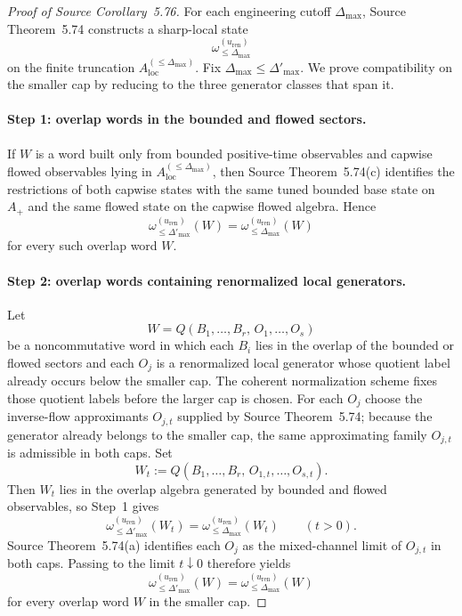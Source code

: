 \begin{proof}[Proof of Source Corollary~5.76]
For each engineering cutoff $\Delta_{\max}$, Source Theorem~5.74 constructs a sharp-local state
\[
\omega^{(u_{\mathrm{ren}})}_{\le \Delta_{\max}}
\]
on the finite truncation $A_{\mathrm{loc}}^{(\le \Delta_{\max})}$. Fix $\Delta_{\max}\le \Delta'_{\max}$. We prove compatibility on the smaller cap by reducing to the three generator classes that span it.

\paragraph*{Step 1: overlap words in the bounded and flowed sectors.}
If $W$ is a word built only from bounded positive-time observables and capwise flowed observables lying in $A_{\mathrm{loc}}^{(\le \Delta_{\max})}$, then Source Theorem~5.74(c) identifies the restrictions of both capwise states with the same tuned bounded base state on $A_+$ and the same flowed state on the capwise flowed algebra. Hence
\[
\omega^{(u_{\mathrm{ren}})}_{\le \Delta'_{\max}}(W)=\omega^{(u_{\mathrm{ren}})}_{\le \Delta_{\max}}(W)
\]
for every such overlap word $W$.

\paragraph*{Step 2: overlap words containing renormalized local generators.}
Let
\[
W=Q(B_1,\dots,B_r,\,O_1,\dots,O_s)
\]
be a noncommutative word in which each $B_i$ lies in the overlap of the bounded or flowed sectors and each $O_j$ is a renormalized local generator whose quotient label already occurs below the smaller cap. The coherent normalization scheme fixes those quotient labels before the larger cap is chosen. For each $O_j$ choose the inverse-flow approximants $O_{j,t}$ supplied by Source Theorem~5.74; because the generator already belongs to the smaller cap, the same approximating family $O_{j,t}$ is admissible in both caps. Set
\[
W_t:=Q(B_1,\dots,B_r,\,O_{1,t},\dots,O_{s,t}).
\]
Then $W_t$ lies in the overlap algebra generated by bounded and flowed observables, so Step~1 gives
\[
\omega^{(u_{\mathrm{ren}})}_{\le \Delta'_{\max}}(W_t)=\omega^{(u_{\mathrm{ren}})}_{\le \Delta_{\max}}(W_t)
\qquad (t>0).
\]
Source Theorem~5.74(a) identifies each $O_j$ as the mixed-channel limit of $O_{j,t}$ in both caps. Passing to the limit $t\downarrow 0$ therefore yields
\[
\omega^{(u_{\mathrm{ren}})}_{\le \Delta'_{\max}}(W)=\omega^{(u_{\mathrm{ren}})}_{\le \Delta_{\max}}(W)
\]
for every overlap word $W$ in the smaller cap.


\end{proof}
